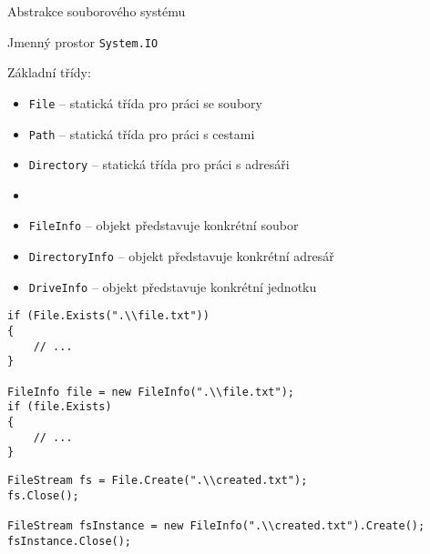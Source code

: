 %
%
%
%
%




\begin{frame}[fragile]
\begin{bitemize}{Abstrakce souborového systému}
\item Jmenný prostor \lstinline|System.IO|
\item Základní třídy:
\begin{itemize}
\item \lstinline|File| -- statická třída pro práci se soubory
\item \lstinline|Path| -- statická třída pro práci s cestami
\item \lstinline|Directory| -- statická třída pro práci s adresáři
\item[]
\item \lstinline|FileInfo| -- objekt představuje konkrétní soubor
\item \lstinline|DirectoryInfo| -- objekt představuje konkrétní adresář
\item \lstinline|DriveInfo| -- objekt představuje konkrétní jednotku

\end{itemize}

\end{bitemize}
\end{frame}




\begin{frame}[fragile]
\begin{yesblock}
\begin{lstlisting}
if (File.Exists(".\\file.txt"))
{
    // ...
}

FileInfo file = new FileInfo(".\\file.txt");
if (file.Exists)
{
    // ...
}
\end{lstlisting}
\end{yesblock}
\vfill
\begin{yesblock}
\begin{lstlisting}
FileStream fs = File.Create(".\\created.txt");
fs.Close();

FileStream fsInstance = new FileInfo(".\\created.txt").Create();
fsInstance.Close();
\end{lstlisting}
\end{yesblock}
\end{frame}




